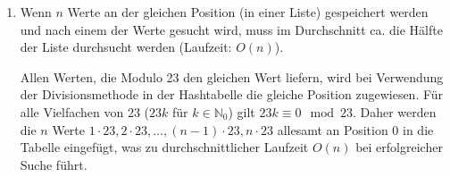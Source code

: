 \documentclass[11pt,a4paper]{article}
\begin{document}
\begin{loesung}
    \begin{enumerate}
        \item Wenn $n$ Werte an der gleichen Position (in einer Liste) gespeichert werden und nach einem der Werte gesucht wird, muss im Durchschnitt ca. die Hälfte der Liste durchsucht werden (Laufzeit: $O(n)$).

        Allen Werten, die Modulo 23 den gleichen Wert liefern, wird bei Verwendung der Divisionsmethode in der Hashtabelle die gleiche Position zugewiesen.
        Für alle Vielfachen von 23 ($23k$ für $k \in \mathbb{N}_0$) gilt $23k \equiv 0 \mod{23}$.
        Daher werden die $n$ Werte $1 \cdot 23, 2 \cdot 23, \ldots, (n - 1) \cdot 23, n \cdot 23$ allesamt an Position $0$ in die Tabelle eingefügt, was zu durchschnittlicher Laufzeit $O(n)$ bei erfolgreicher Suche führt.
        

\end{enumerate}
\end{loesung}
\end{document}
